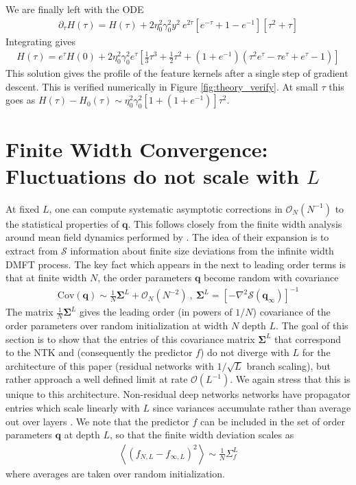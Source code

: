\documentclass{article} %
\begin{document}
We are finally left with the ODE
\begin{align}
    \partial_\tau H(\tau) = H(\tau) + 2 \eta_0^2 \gamma_0^2 y^2 \  e^{2 \tau} [e^{-\tau} + 1 - e^{-1}] [\tau^2 + \tau]
\end{align}
Integrating gives
\begin{align}
    H(\tau) = e^{\tau}H(0) + 2 \eta_0^2 \gamma_0^2 e^{\tau} \left[ \frac{1}{3} \tau^3 + \frac{1}{2} \tau^2 + (1+e^{-1})( \tau^2 e^{\tau} - \tau e^\tau +  e^\tau - 1) \right]
\end{align}
This solution gives the profile of the feature kernels after a single step of gradient descent. This is verified numerically in Figure \ref{fig:theory_verify}. At small $\tau$ this goes as $H(\tau) - H_0(\tau) \sim \eta_0^2 \gamma_0^2 [ 1 + (1+e^{-1})] \tau^2$. 

\section{Finite Width Convergence: Fluctuations do not scale with $L$}\label{app:finite_N_fluctuation_scaling}

At fixed $L$, one can compute systematic asymptotic corrections in $\mathcal{O}_N(N^{-1})$ to the statistical properties of $\bm q$. This follows closely from the finite width analysis around mean field dynamics performed by \cite{bordelon2023dynamics}. The idea of their expansion is to extract from $\mathcal S$ information about finite size deviations from the infinite width DMFT process. The key fact which appears in the next to leading order terms is that at finite width $N$, the order parameters $\bm q$ become random with covariance 
\begin{align}
    \text{Cov}(\bm q ) \sim \frac{1}{N} \bm\Sigma^L + \mathcal{O}_N(N^{-2})
    \ , \ \bm\Sigma^L = \left[ - \nabla^2 \mathcal S(\bm q_\infty) \right]^{-1}
\end{align}
The matrix $\frac{1}{N} \bm\Sigma^L$ gives the leading order (in powers of $1/N$) covariance of the order parameters over random initialization at width $N$ depth $L$. The goal of this section is to show that the entries of this covariance matrix $\bm\Sigma^L$ that correspond to the NTK and (consequently the predictor $f$) do not diverge with $L$ for the architecture of this paper (residual networks with $1/\sqrt L$ branch scaling), but rather approach a well defined limit at rate $\mathcal{O}(L^{-1})$. We again stress that this is unique to this architecture. Non-residual deep networks networks have propagator entries which scale linearly with $L$ since variances accumulate rather than average out over layers \citep{bordelon2022influence, bordelon2023dynamics}. We note that the predictor $f$ can be included in the set of order parameters $\bm q$ at depth $L$, so that the finite width deviation scales as
\begin{align}
    \left< ( f_{N,L} - f_{\infty, L} )^2 \right> \sim \frac{1}{N} \Sigma_{f}^L
\end{align}
where averages are taken over random initialization. 
\end{document}
